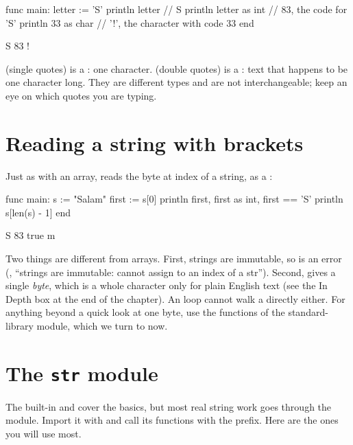 \begin{salamen}
func main:
    letter := 'S'
    println letter              // S
    println letter as int       // 83, the code for 'S'
    println 33 as char          // '!', the character with code 33
end
\end{salamen}

\begin{progout}
S
83
!
\end{progout}

\begin{note}
 (single quotes) is a : one character.  (double
quotes) is a : text that happens to be one character long. They are
different types and are not interchangeable; keep an eye on which quotes you are
typing.
\end{note}

\section{Reading a string with brackets}

Just as with an array,  reads the byte at index  of a string,
as a :

\begin{salamen}
func main:
    s := "Salam"
    first := s[0]
    println first, first as int, first == 'S'
    println s[len(s) - 1]
end
\end{salamen}

\begin{progout}
S 83 true
m
\end{progout}

Two things are different from arrays. First, strings are immutable, so
 is an error (, ``strings are immutable: cannot
assign to an index of a \textquotesingle{}str\textquotesingle{}''). Second,  gives a single
\emph{byte}, which is a whole character only for plain English text (see the In
Depth box at the end of the chapter). An  loop cannot walk a
 directly either. For anything beyond a quick look at one byte, use the
functions of the  standard-library module, which we turn to now.

\section{The \texttt{str} module}

The built-in \code{+} and  cover the basics, but most real string work
goes through the  module. Import it with  and call
its functions with the  prefix. Here are the ones you will use most.

